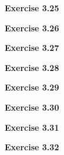 \documentclass{article}
\begin{document}
\bigskip

\begin{framed}
    \noindent \textbf{Exercise 3.25}
    
    \medskip
    
    
\end{framed}

\bigskip

\begin{framed}
    \noindent \textbf{Exercise 3.26}
    
    \medskip
    
    
\end{framed}

\bigskip

\begin{framed}
    \noindent \textbf{Exercise 3.27}
    
    \medskip
    
    
\end{framed}

\bigskip

\begin{framed}
    \noindent \textbf{Exercise 3.28}
    
    \medskip
    
    
\end{framed}

\bigskip

\begin{framed}
    \noindent \textbf{Exercise 3.29}
    
    \medskip
    
    
\end{framed}

\bigskip

\begin{framed}
    \noindent \textbf{Exercise 3.30}
    
    \medskip
    
    
\end{framed}

\bigskip

\begin{framed}
    \noindent \textbf{Exercise 3.31}
    
    \medskip
    
    
\end{framed}

\bigskip

\begin{framed}
    \noindent \textbf{Exercise 3.32}
    
    \medskip
    
    
\end{framed}
\end{document}
